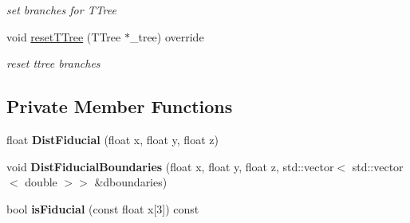 \begin{DoxyCompactItemize}
\begin{DoxyCompactList}\small\item\em set branches for T\+Tree \end{DoxyCompactList}\item 
void \hyperlink{classanalysis_1_1ContainmentAnalysis_a6e5a6d76850458abc42a252cec25063f}{reset\+T\+Tree} (T\+Tree $\ast$\+\_\+tree) override\hypertarget{classanalysis_1_1ContainmentAnalysis_a6e5a6d76850458abc42a252cec25063f}{}\label{classanalysis_1_1ContainmentAnalysis_a6e5a6d76850458abc42a252cec25063f}

\begin{DoxyCompactList}\small\item\em reset ttree branches \end{DoxyCompactList}\end{DoxyCompactItemize}
\subsection*{Private Member Functions}
\begin{DoxyCompactItemize}
\item 
float {\bfseries Dist\+Fiducial} (float x, float y, float z)\hypertarget{classanalysis_1_1ContainmentAnalysis_af1ae4a6e17c26624f1ffc789a1a28370}{}\label{classanalysis_1_1ContainmentAnalysis_af1ae4a6e17c26624f1ffc789a1a28370}

\item 
void {\bfseries Dist\+Fiducial\+Boundaries} (float x, float y, float z, std\+::vector$<$ std\+::vector$<$ double $>$$>$ \&dboundaries)\hypertarget{classanalysis_1_1ContainmentAnalysis_a403e7651d9e20b4f672232e05a967472}{}\label{classanalysis_1_1ContainmentAnalysis_a403e7651d9e20b4f672232e05a967472}

\item 
bool {\bfseries is\+Fiducial} (const float x\mbox{[}3\mbox{]}) const \hypertarget{classanalysis_1_1ContainmentAnalysis_a8262e90f9a7c083f71a8c80d4b07c7fe}{}\label{classanalysis_1_1ContainmentAnalysis_a8262e90f9a7c083f71a8c80d4b07c7fe}

\end{DoxyCompactItemize}
